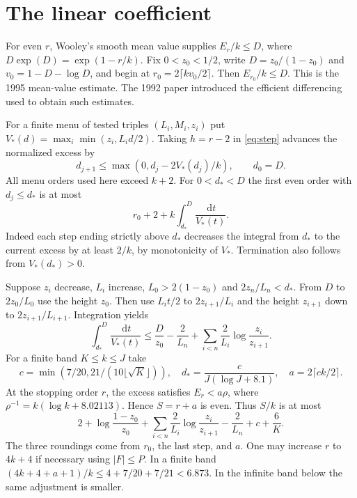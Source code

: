 \documentclass[11pt,letterpaper]{article}
\theoremstyle{definition}
\newcommand{\dd}{\,\mathrm d}
\begin{document}
\section{The linear coefficient}\label{sec:price}
For even $r$, Wooley's smooth mean value \cite[Lemma 2.1]{W95} supplies
$E_r/k\le D$, where $D\exp(D)=\exp(1-r/k)$. Fix $0<z_0<1/2$, write
$D=z_0/(1-z_0)$ and $v_0=1-D-\log D$, and begin at
$r_0=2\lceil kv_0/2\rceil$. Then $E_{r_0}/k\le D$.
This is the 1995 mean-value estimate. The 1992 paper \cite{W92}
introduced the efficient differencing used to obtain such estimates.

For a finite menu of tested triples $(L_i,M_i,z_i)$ put
$V_*(d)=\max_i\min(z_i,L_i d/2)$. Taking $h=r-2$ in
\eqref{eq:step} advances the normalized excess by
\begin{equation}\label{eq:update}
 d_{j+1}\le\max(0,d_j-2V_*(d_j)/k),\qquad d_0=D .
\end{equation}
All menu orders used here exceed $k+2$.
For $0<d_*<D$ the first even order with $d_j\le d_*$ is at most
\begin{equation}\label{eq:price}
 r_0+2+k\int_{d_*}^D\frac{\dd t}{V_*(t)} .
\end{equation}
Indeed each step ending strictly above $d_*$ decreases the integral
from $d_*$ to the current excess by at least $2/k$, by monotonicity
of $V_*$. Termination also follows from $V_*(d_*)>0$.

Suppose $z_i$ decrease, $L_i$ increase, $L_0>2(1-z_0)$ and
$2z_n/L_n<d_*$. From $D$ to $2z_0/L_0$ use the height $z_0$. Then
use $L_i t/2$ to $2z_{i+1}/L_i$ and the height $z_{i+1}$ down
to $2z_{i+1}/L_{i+1}$. Integration yields
\begin{equation}\label{eq:menu}
 \int_{d_*}^D\frac{\dd t}{V_*(t)}
 \le \frac{D}{z_0}-\frac2{L_n}
 +\sum_{i<n}\frac2{L_i}\log\frac{z_i}{z_{i+1}} .
\end{equation}
For a finite band $K\le k\le J$ take
\[
 c=\min(7/20,21/(10\lfloor\sqrt K\rfloor)),\quad
 d_*=\frac{c}{J(\log J+8.1)},\quad a=2\lceil ck/2\rceil .
\]
At the stopping order $r$, the excess satisfies
$E_r<a\rho$, where $\rho^{-1}=k(\log k+8.02113)$. Hence $S=r+a$
is even. Thus $S/k$ is at most
\begin{equation}\label{eq:finite-price}
 2+\log\frac{1-z_0}{z_0}
  +\sum_{i<n}\frac2{L_i}\log\frac{z_i}{z_{i+1}}
  -\frac2{L_n}+c+\frac6K .
\end{equation}
The three roundings come from $r_0$, the last step, and $a$.
One may increase $r$ to $4k+4$ if necessary using $|F|\le P$.
In a finite band $(4k+4+a+1)/k\le4+7/20+7/21<6.873$.
In the infinite band below the same adjustment is smaller.
\end{document}
